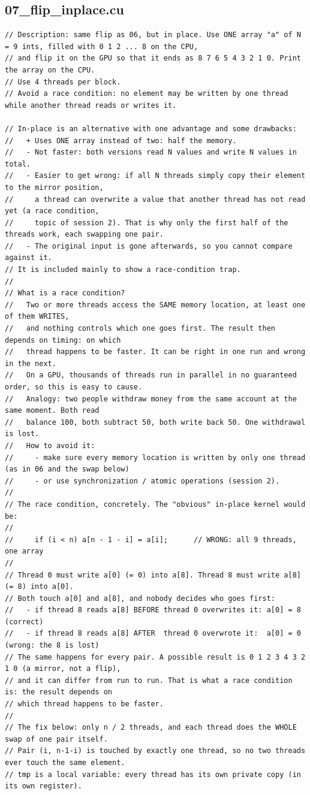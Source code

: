 \documentclass[main.tex]{subfiles}
\begin{document}
\subsection{07\_flip\_inplace.cu}
\begin{lstlisting}[language=CUDA]
// Description: same flip as 06, but in place. Use ONE array "a" of N = 9 ints, filled with 0 1 2 ... 8 on the CPU,
// and flip it on the GPU so that it ends as 8 7 6 5 4 3 2 1 0. Print the array on the CPU.
// Use 4 threads per block.
// Avoid a race condition: no element may be written by one thread while another thread reads or writes it.

// In-place is an alternative with one advantage and some drawbacks:
//   + Uses ONE array instead of two: half the memory.
//   - Not faster: both versions read N values and write N values in total.
//   - Easier to get wrong: if all N threads simply copy their element to the mirror position,
//     a thread can overwrite a value that another thread has not read yet (a race condition,
//     topic of session 2). That is why only the first half of the threads work, each swapping one pair.
//   - The original input is gone afterwards, so you cannot compare against it.
// It is included mainly to show a race-condition trap.
//
// What is a race condition?
//   Two or more threads access the SAME memory location, at least one of them WRITES,
//   and nothing controls which one goes first. The result then depends on timing: on which
//   thread happens to be faster. It can be right in one run and wrong in the next.
//   On a GPU, thousands of threads run in parallel in no guaranteed order, so this is easy to cause.
//   Analogy: two people withdraw money from the same account at the same moment. Both read
//   balance 100, both subtract 50, both write back 50. One withdrawal is lost.
//   How to avoid it:
//     - make sure every memory location is written by only one thread (as in 06 and the swap below)
//     - or use synchronization / atomic operations (session 2).
//
// The race condition, concretely. The "obvious" in-place kernel would be:
//
//     if (i < n) a[n - 1 - i] = a[i];      // WRONG: all 9 threads, one array
//
// Thread 0 must write a[0] (= 0) into a[8]. Thread 8 must write a[8] (= 8) into a[0].
// Both touch a[0] and a[8], and nobody decides who goes first:
//   - if thread 8 reads a[8] BEFORE thread 0 overwrites it: a[0] = 8   (correct)
//   - if thread 8 reads a[8] AFTER  thread 0 overwrote it:  a[0] = 0   (wrong: the 8 is lost)
// The same happens for every pair. A possible result is 0 1 2 3 4 3 2 1 0 (a mirror, not a flip),
// and it can differ from run to run. That is what a race condition is: the result depends on
// which thread happens to be faster.
//
// The fix below: only n / 2 threads, and each thread does the WHOLE swap of one pair itself.
// Pair (i, n-1-i) is touched by exactly one thread, so no two threads ever touch the same element.
// tmp is a local variable: every thread has its own private copy (in its own register).


\end{lstlisting}
\end{document}
